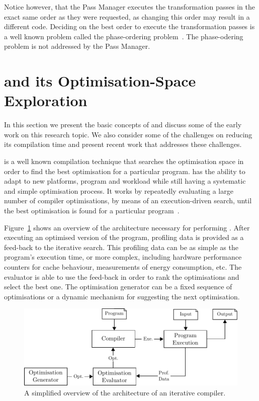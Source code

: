Notice however, that the Pass Manager executes the transformation passes in the exact same order as they were requested, as changing this order may result in a different code.
Deciding on the best order to execute the transformation passes is a well known problem called the phase-ordering problem~\citep{touati06,kulkarni12,jantz14}.
The phase-odering problem is not addressed by the Pass Manager.

\section{{\IterComp} and its Optimisation-Space Exploration}

In this section we present the basic concepts of {\itercomp} and discuss some of the early work on this research topic.
We also consider some of the challenges on reducing its compilation time and present recent work that addresses these challenges.

{\Itercomp} is a well known compilation technique that searches the optimisation space in order to find the best optimisation for a particular program.
{\Itercomp} has the ability to adapt to new platforms, program and workload while still having a systematic and simple optimisation process.
It works by repeatedly evaluating a large number of compiler optimisations, by means of an execution-driven search, until the best optimisation is found for a particular program~\citep{kisuki99,fursin07,chen10}.

Figure~\ref{fig:itercomp-diagram} shows an overview of the architecture necessary for performing {\itercomp}.
After executing an optimised version of the program, profiling data is provided as a feed-back to the iterative search.
This profiling data can be as simple as the program's execution time, or more complex, including hardware performance counters for cache behaviour, measurements of energy consumption, etc.
The evaluator is able to use the feed-back in order to rank the optimisations and select the best one.
The optimisation generator can be a fixed sequence of optimisations or a dynamic mechanism for suggesting the next optimisation.

\begin{figure}[htb]
    \centering
    \includegraphics[width=\linewidth]{figs/itercomp-diagram}
    \caption{A simplified overview of the architecture of an iterative compiler.}
    \label{fig:itercomp-diagram}
\end{figure}


